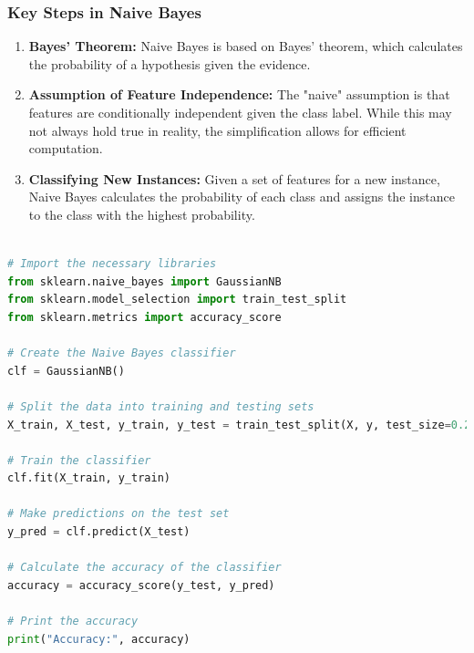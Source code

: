 \documentclass[openany]{report}
\begin{document}
\subsubsection{Key Steps in Naive Bayes}
\begin{enumerate}
    \item \textbf{Bayes' Theorem:} Naive Bayes is based on Bayes' theorem, which calculates the probability of a hypothesis given the evidence.
    \item \textbf{Assumption of Feature Independence:} The "naive" assumption is that features are conditionally independent given the class label. While this may not always hold true in reality, the simplification allows for efficient computation.
    \item \textbf{Classifying New Instances:} Given a set of features for a new instance, Naive Bayes calculates the probability of each class and assigns the instance to the class with the highest probability.
\end{enumerate}

\begin{lstlisting}[language=python, caption=training a Naive bayes model.]
    
# Import the necessary libraries
from sklearn.naive_bayes import GaussianNB
from sklearn.model_selection import train_test_split
from sklearn.metrics import accuracy_score

# Create the Naive Bayes classifier
clf = GaussianNB()

# Split the data into training and testing sets
X_train, X_test, y_train, y_test = train_test_split(X, y, test_size=0.2, random_state=42)

# Train the classifier
clf.fit(X_train, y_train)

# Make predictions on the test set
y_pred = clf.predict(X_test)

# Calculate the accuracy of the classifier
accuracy = accuracy_score(y_test, y_pred)

# Print the accuracy
print("Accuracy:", accuracy)
\end{lstlisting}
\end{document}

